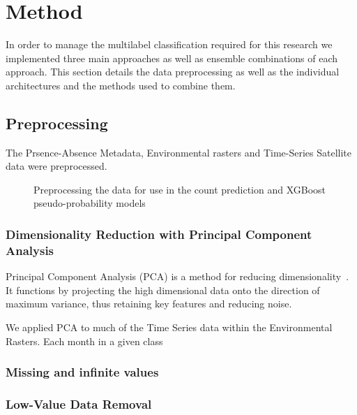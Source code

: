 \section{Method}

In order to manage the multilabel classification required for this research we implemented three main approaches as well as ensemble combinations of each approach.
This section details the data preprocessing as well as the individual architectures and the methods used to combine them.

\subsection{Preprocessing}

The Prsence-Absence Metadata, Environmental rasters and Time-Series Satellite data were preprocessed.

\begin{figure}\label{fig:preproc}
    \begin{center}
        
        \caption{Preprocessing the data for use in the count prediction and XGBoost pseudo-probability models}
    \end{center}
\end{figure}

\subsubsection{Dimensionality Reduction with Principal Component Analysis}
Principal Component Analysis (PCA) is a method for reducing dimensionality~\cite{pcapaper}. 
It functions by projecting the high dimensional data onto the direction of maximum variance, thus retaining key features and reducing noise.

We applied PCA to much of the Time Series data within the Environmental Rasters. Each month in a given class 


\subsubsection{Missing and infinite values}


\subsubsection{Low-Value Data Removal}

% 

